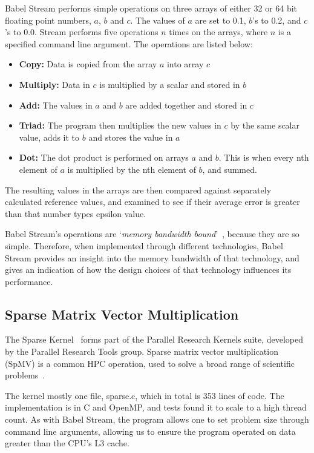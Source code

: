 Babel Stream performs simple operations on three arrays of either 32 or 64 bit floating point numbers, $a$, $b$ and $c$. The values of $a$ are set to 0.1, $b$'s to 0.2, and $c$'s to 0.0. Stream performs five operations $n$ times on the arrays, where $n$ is a specified command line argument. The operations are listed below:
\begin{itemize}
  \item \textbf{Copy:} Data is copied from the array $a$ into array $c$
  \item \textbf{Multiply:} Data in $c$ is multiplied by a scalar and stored in $b$
  \item \textbf{Add:} The values in $a$ and $b$ are added together and stored in $c$
  \item \textbf{Triad:} The program then multiplies the new values in $c$ by the same scalar value, adds it to $b$ and stores the value in $a$
  \item \textbf{Dot:} The dot product is performed on arrays $a$ and $b$. This is when every nth element of $a$ is multiplied by the nth element of $b$, and summed.
\end{itemize}
The resulting values in the arrays are then compared against separately calculated reference values, and examined to see if their average error is greater than that number types epsilon value.

Babel Stream's operations are `\textit{memory bandwidth bound}'~\cite{BabelStream}, because they are so simple. Therefore, when implemented through different technologies, Babel Stream provides an insight into the memory bandwidth of that technology, and gives an indication of how the design choices of that technology influences its performance.

\subsection{Sparse Matrix Vector Multiplication}

The Sparse Kernel~\cite{ParResSparse} forms part of the Parallel Research Kernels suite, developed by the Parallel Research Tools group. Sparse matrix vector multiplication (SpMV) is a common HPC operation, used to solve a broad range of scientific problems~\cite{Sedaghati:2015, spMVGPU, DBLP:journals}.

The kernel mostly one file, sparse.c, which in total is 353 lines of code. The implementation is in C and OpenMP, and tests found it to scale to a high thread count. As with Babel Stream, the program allows one to set problem size through command line arguments, allowing us to ensure the program operated on data greater than the CPU's L3 cache.

